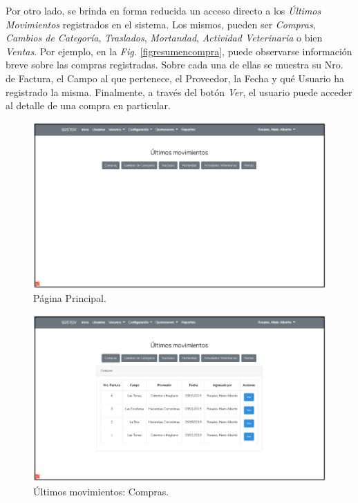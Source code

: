 \documentclass[11pt,oneside]{book}
\begin{document}
Por otro lado, se brinda en forma reducida un acceso directo a los \textit{Últimos Movimientos} registrados en el sistema. Los mismos, pueden ser \textit{Compras}, \textit{Cambios de Categoría}, \textit{Traslados}, \textit{Mortandad}, \textit{Actividad Veterinaria} o bien \textit{Ventas}. Por ejemplo, en la \textit{Fig.} \eqref{figresumencompra}, puede observarse información breve sobre las compras registradas. Sobre cada una de ellas se muestra su Nro. de Factura, el Campo al que pertenece, el Proveedor, la Fecha y qué Usuario ha registrado la misma. Finalmente, a través del botón \textit{Ver}, el usuario puede acceder al detalle de una compra en particular.
\begin{figure}[tbhp]
\centerline{\includegraphics[scale=0.87]{figs/capitulo_4_desarrollo/fig403.pdf}}
\caption{Página Principal.}
\label{fig403}
\end{figure}

\begin{figure}[tbhp]
\centerline{\includegraphics[scale=0.87]{figs/capitulo_4_desarrollo/resumen_compra.pdf}}
\caption{Últimos movimientos: Compras.}
\label{figresumencompra}
\end{figure}
\end{document}
